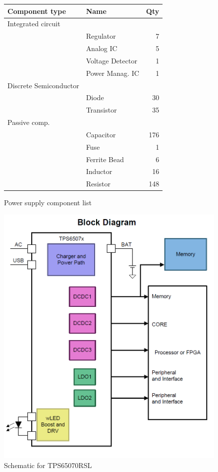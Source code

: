 \documentclass[11pt,a4paper,titlepage]{article}
\begin{document}
				\begin{figure}
				  \begin{minipage}{.5\textwidth}
				  \centering
				  \begin{tabular}{llr}
				  \toprule
				  \textbf{Component type} & \textbf{Name} & \textbf{Qty}\\
				  \midrule
				  Integrated circuit & & \\
				   & Regulator & 7\\
				   & Analog IC & 5\\
				   & Voltage Detector & 1\\
				   & Power Manag. IC & 1\\
				  \hline
				  Discrete Semiconductor & &\\
				   & Diode & 30\\
				   & Transistor & 35\\
				  \hline
				  Passive comp. & &\\
				   & Capacitor & 176\\
				   & Fuse & 1\\
				   & Ferrite Bead & 6\\
				   & Inductor & 16\\
				   & Resistor & 148\\
				  \bottomrule
				  \end{tabular}
				  \caption{Power supply component list}
				  \label{tab:power}
				  \end{minipage}
					\begin{minipage}{.5\textwidth}
				  \centering
				  \includegraphics[width = .9\textwidth]{power_managIC.png}
				  \caption{Schematic for TPS65070RSL}
				  \label{fig:TPS65070RSL}
				  \end{minipage}
				\end{figure}
\end{document}
